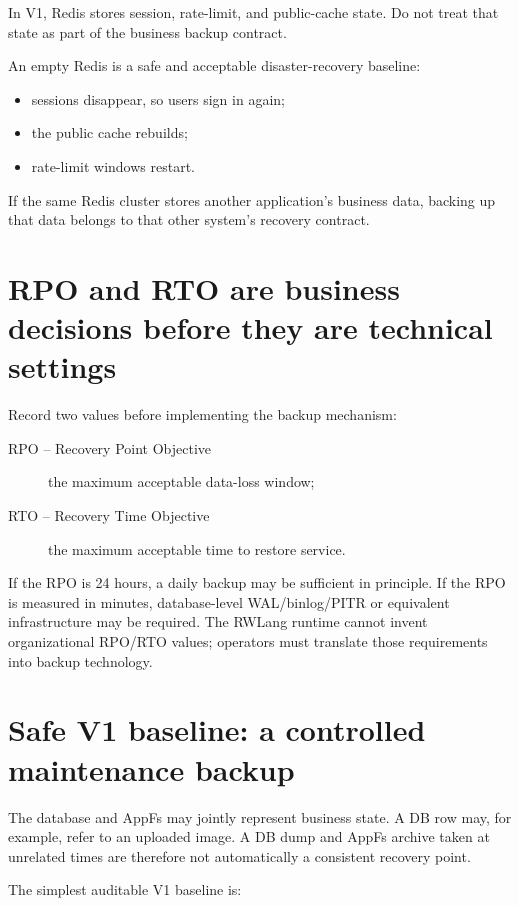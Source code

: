 In V1, Redis stores session, rate-limit, and public-cache state. Do not treat that state as part of the business backup contract.

An empty Redis is a safe and acceptable disaster-recovery baseline:

\begin{itemize}
  \item sessions disappear, so users sign in again;
  \item the public cache rebuilds;
  \item rate-limit windows restart.
\end{itemize}

If the same Redis cluster stores another application's business data, backing up that data belongs to that other system's recovery contract.

\section{RPO and RTO are business decisions before they are technical settings}

Record two values before implementing the backup mechanism:

\begin{description}
  \item[RPO -- Recovery Point Objective] the maximum acceptable data-loss window;
  \item[RTO -- Recovery Time Objective] the maximum acceptable time to restore service.
\end{description}

If the RPO is 24 hours, a daily backup may be sufficient in principle. If the RPO is measured in minutes, database-level WAL/binlog/PITR or equivalent infrastructure may be required. The RWLang runtime cannot invent organizational RPO/RTO values; operators must translate those requirements into backup technology.

\section{Safe V1 baseline: a controlled maintenance backup}

The database and AppFs may jointly represent business state. A DB row may, for example, refer to an uploaded image. A DB dump and AppFs archive taken at unrelated times are therefore not automatically a consistent recovery point.

The simplest auditable V1 baseline is:

